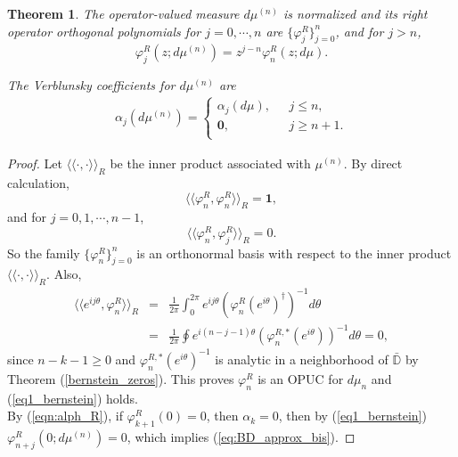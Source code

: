 \documentclass[11pt]{article}
\newtheorem{theorem}{Theorem}[section]
\begin{document}
\begin{theorem}
The operator-valued measure $d\mu^{(n)}$ is normalized and its right operator orthogonal polynomials for $j=0, \cdots , n$ are $\{\varphi_{j}^{R}\}_{j=0}^{n}$, and for $j>n$, 
\begin{equation}\label{eq1_bernstein}
    \varphi_{j}^{R}(z; d\mu^{(n)})=z^{j-n}\varphi_{n}^{R}(z; d\mu).
\end{equation}

\noindent The Verblunsky coefficients for $d\mu^{(n)}$ are 
\begin{eqnarray}\label{eq:BD_approx_bis}
\alpha_{j}(d\mu^{(n)})= \left\{ 
	\begin{array}{ll}
        \alpha_{j}(d\mu),& \mbox{ $j\leq n$} , \\
        \mathbf{0},  & \mbox{ $j\geq n+1$}.\\
    \end{array}
    \right.    
\end{eqnarray} 
\end{theorem}
\begin{proof}
Let $\langle\langle \cdot, \cdot\rangle \rangle_{R}$ be the inner product associated with $\mu^{(n)}$. By direct calculation, 
\begin{equation}
\langle\langle \varphi_{n}^{R}, \varphi_{n}^{R} \rangle \rangle_{R} = \mathbf{1},
\end{equation}
and for $j = 0,1, \cdots, n-1$,
\begin{equation}
\langle\langle \varphi_{n}^{R}, \varphi_{j}^{R} \rangle \rangle_{R} = 0.
\end{equation}
So the family $\{\varphi_{n}^{R}\}_{j=0}^{n}$ is an orthonormal basis with respect to the inner product $\langle\langle \cdot, \cdot\rangle \rangle_{R}$. Also,
\begin{eqnarray*}
    \langle\langle e^{ij\theta}, \varphi_{n}^{R} \rangle \rangle_{R} &=&\frac{1}{2\pi}\int_{0}^{2\pi}e^{ij\theta}(\varphi_{n}^{R}(e^{i\theta})^{\dag})^{-1}d\theta\\
    &=& \frac{1}{2\pi}\oint e^{i(n-j-1)\theta}(\varphi_{n}^{R, *}(e^{i\theta}))^{-1}d\theta = 0,
\end{eqnarray*}
\noindent since $n-k-1 \geq 0$ and $\varphi_{n}^{R, *}(e^{i\theta})^{-1}$ is analytic in a neighborhood of $\bar{\mathbb{D}}$ by Theorem (\ref{bernstein_zeros}). This proves $\varphi_{n}^{R}$ is an OPUC for $d\mu_{n}$ and (\ref{eq1_bernstein}) holds. \\
By (\ref{eqn:alph_R}), if $\varphi^{R}_{k+1}(0)=0$, then $\alpha_k=0$, then by (\ref{eq1_bernstein}) $\varphi_{n+j}^{R}(0; d\mu^{(n)})=0$, which implies (\ref{eq:BD_approx_bis}).
\end{proof}
\end{document}
